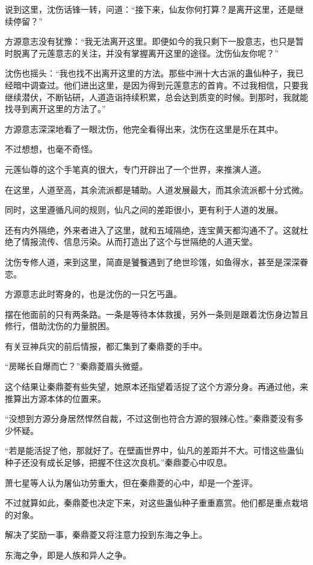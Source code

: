 \begin{this_body}
说到这里，沈伤话锋一转，问道：“接下来，仙友你何打算？是离开这里，还是继续停留？”

方源意志没有犹豫：“我无法离开这里。即便如今的我只剩下一股意志，也只是暂时脱离了元莲意志的关注，并没有掌握离开这里的途径。沈伤仙友你呢？”

沈伤也摇头：“我也找不出离开这里的方法。那些中洲十大古派的蛊仙种子，我已经暗中调查过。他们进出这里，是因为得到元莲意志的首肯。不过我相信，只要我继续潜伏，不断钻研，人道造诣持续积累，总会达到质变的时候。到那时，我就能找寻到离开这里的方法了。”

方源意志深深地看了一眼沈伤，他完全看得出来，沈伤在这里是乐在其中。

不过想想，也毫不奇怪。

元莲仙尊的这个手笔真的很大，专门开辟出了一个世界，来推演人道。

在这里，人道至高，其余流派都是辅助。人道发展最大，而其余流派都十分式微。

同时，这里遵循凡间的规则，仙凡之间的差距很小，更有利于人道的发展。

还有内外隔绝，外来者进入了这里，就和五域隔绝，连宝黄天都沟通不了。这就杜绝了情报流传、信息污染。从而打造出了这个与世隔绝的人道天堂。

沈伤专修人道，来到这里，简直是饕餮遇到了绝世珍馐，如鱼得水，甚至是深深眷恋。

方源意志此时寄身的，也是沈伤的一只乞丐蛊。

摆在他面前的只有两条路。一条是等待本体救援，另外一条则是跟着沈伤身边暂且修行，借助沈伤的力量脱困。

有关豆神兵灾的前后情报，都汇集到了秦鼎菱的手中。

“房睇长自爆而亡？”秦鼎菱眉头微蹙。

这个结果让秦鼎菱有些失望，她原本还指望着活捉了这个方源分身。再通过他，来推算出方源本体的位置来。

“没想到方源分身居然悍然自裁，不过这倒也符合方源的狠辣心性。”秦鼎菱没有多少怀疑。

“若是能活捉了他，那就好了。在壁画世界中，仙凡的差距并不大。可惜这些蛊仙种子还没有成长足够，把握不住这次良机。”秦鼎菱心中叹息。

萧七星等人认为屠仙功劳重大，但在秦鼎菱的心中，却是一个差评。

不过就算如此，秦鼎菱也决定下来，对这些蛊仙种子重重嘉赏。他们都是重点栽培的对象。

解决了奖励一事，秦鼎菱又将注意力投到东海之争上。

东海之争，即是人族和异人之争。


\end{this_body}
